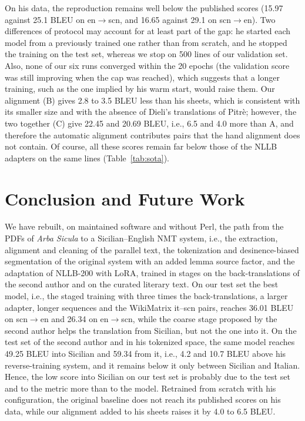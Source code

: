\documentclass[11pt,a4paper]{article}
\begin{document}
On his data, the reproduction remains well below the published scores (15.97 against 25.1
BLEU on en$\rightarrow$scn, and 16.65 against 29.1 on scn$\rightarrow$en). Two differences of
protocol may account for at least part of the gap: he started each model from a previously
trained one rather than from scratch, and he stopped the training on the test set,
whereas we stop on 500 lines of our validation set. Also, none of our six runs converged within
the 20 epochs (the validation score was still improving when the cap was reached), which suggests
that a longer training, such as the one implied by his warm start, would raise them. Our
alignment (B) gives 2.8 to 3.5 BLEU less than his sheets, which is consistent with its
smaller size and with the absence of Dieli's translations of Pitr\`e; however, the two together
(C) give 22.45 and 20.69 BLEU, i.e., 6.5 and 4.0 more than A, and therefore the
automatic alignment contributes pairs that the hand alignment does not contain. Of course, all
these scores remain far below those of the NLLB adapters on the same lines (Table~\ref{tab:sota}).






\section{Conclusion and Future Work}
\label{sec:conclusion}
We have rebuilt, on maintained software and without Perl, the path from the PDFs of \emph{Arba
Sicula} to a Sicilian--English NMT system, i.e., the extraction, alignment and cleaning of the
parallel text, the tokenization and desinence-biased segmentation of the original system with
an added lemma source factor, and the adaptation of NLLB-200 with LoRA, trained in stages on the
back-translations of the second author and on the curated literary text. On our test set the
best model, i.e., the staged training with three times the back-translations, a larger adapter,
longer sequences and the WikiMatrix it--scn pairs, reaches 36.01 BLEU on scn$\rightarrow$en and 26.34 on en$\rightarrow$scn,
while the coarse stage proposed by the second author helps the translation from Sicilian, but not
the one into it. On the test set of the second author and in his tokenized space, the same model
reaches 49.25 BLEU into Sicilian and 59.34 from it, i.e., 4.2 and 10.7 BLEU above his
reverse-training system, and it remains below it only between Sicilian and Italian. Hence, the
low score into Sicilian on our test set is probably due to the test set and to the metric more
than to the model. Retrained from scratch with his configuration, the original baseline does not reach its
published scores on his data, while our alignment added to his sheets raises it by 4.0 to 6.5
BLEU.
\end{document}
